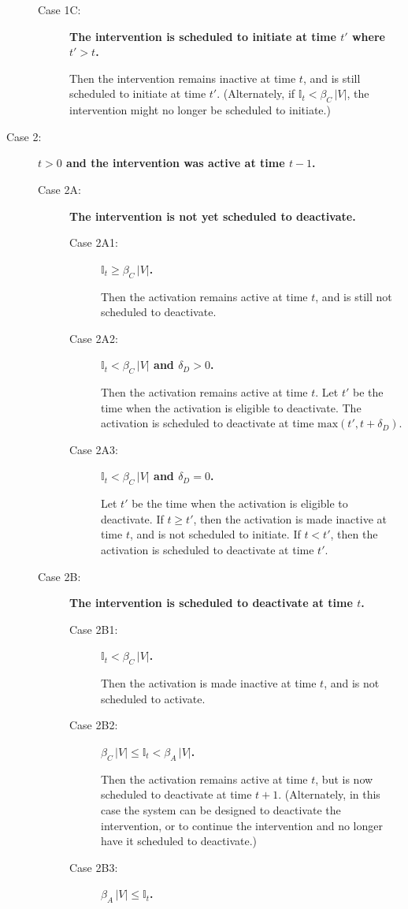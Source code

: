 \documentclass[11pt]{article}
\newcommand{\istate}{\mbox{$\mathbb{I}$}}
\begin{document}
\begin{description}
\begin{description}
\item
[Case 1C:]
{\bf The intervention is scheduled to initiate at time $t'$ where $t' > t$.}

Then the intervention remains inactive at time $t$, 
and is still scheduled to initiate at time $t'$.
(Alternately, if $\istate_t < \beta_C \, |V|$, the intervention might no longer be scheduled to initiate.)
\end{description}

\item
[Case 2:]
{\bf $t > 0$ and the intervention was active at time $t\!-\!1$.}
\begin{description}
\item
[Case 2A:]
{\bf The intervention is not yet scheduled to deactivate.}
\begin{description}
\item
[Case 2A1:] 
{\bf $\istate_t \geq \beta_C \, |V|$.}

Then the activation remains active at time $t$, and is still not scheduled to  deactivate.
\item
[Case 2A2:] 
{\bf $\istate_t < \beta_C \, |V|$ and $\delta_D > 0$.}

Then the activation remains active at time $t$.
Let $t'$ be the time when the activation is eligible to deactivate.
The activation is scheduled to deactivate at time $\mbox{max}(t', t+\delta_D)$.
\item
[Case 2A3:] 
{\bf $\istate_t < \beta_C \, |V|$ and $\delta_D = 0$.}

Let $t'$ be the time when the activation is eligible to deactivate.
If $t \geq t'$, then the activation is made inactive at time $t$, and is  not scheduled to initiate.
If $t < t'$, then the activation is scheduled to deactivate at time $t'$.
\end{description}

\item
[Case 2B:]
{\bf The intervention is scheduled to deactivate at time $t$.}
\begin{description}
\item
[Case 2B1:] 
{\bf $\istate_t < \beta_C \, |V|$.}

Then the activation is made inactive at time $t$, and is not scheduled to activate.
\item
[Case 2B2:] 
{\bf $\beta_C \, |V| \leq \istate_t < \beta_A \, |V|$.}

Then the activation remains active at time $t$,
but is now scheduled to deactivate at time $t+1$.
(Alternately, in this case the system can be designed to deactivate the intervention,
or to continue the intervention and no longer have it scheduled to deactivate.)
\item
[Case 2B3:] 
{\bf $\beta_A \, |V| \leq \istate_t$.}


\end{description}
\end{description}
\end{description}
\end{document}
